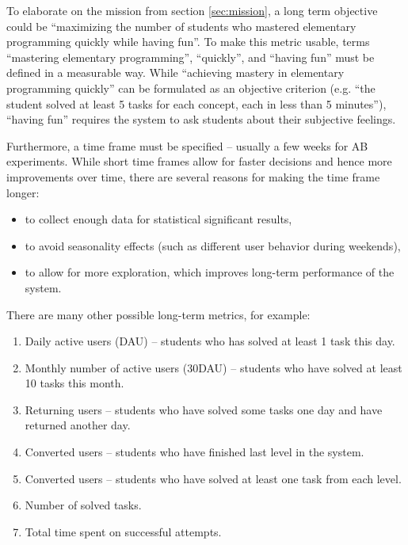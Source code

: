 To elaborate on the mission from section \ref{sec:mission},
  a long term objective could be
  ``maximizing the number of students
  who mastered elementary programming quickly while having fun''.
To make this metric usable,
  terms ``mastering elementary programming'', ``quickly'', and ``having fun''
  must be defined in a measurable way.
While ``achieving mastery in elementary programming quickly'' can be
  formulated as an objective criterion
  (e.g. ``the student solved at least 5 tasks for each concept, each in less than 5 minutes''),
  ``having fun'' requires the system to ask students about their subjective feelings.

Furthermore, a time frame must be specified
  -- usually a few weeks for AB experiments.
While short time frames allow for faster decisions and hence more improvements over time,
there are several reasons for making the time frame longer:
\begin{itemize}
  \item to collect enough data for statistical significant results,
  \item to avoid seasonality effects (such as different user behavior during weekends),
  \item to allow for more exploration, which improves long-term performance of the system.
\end{itemize}

There are many other possible long-term metrics, for example:
\begin{enumerate}
  \item Daily active users (DAU) -- students who has solved at least 1 task this day.
  \item Monthly number of active users (30DAU) -- students who have solved at least 10 tasks this month.
  \item Returning users -- students who have solved some tasks one day and have returned another day.
  \item Converted users -- students who have finished last level in the system.
  \item Converted users -- students who have solved at least one task from each level.
  \item Number of solved tasks.
  \item Total time spent on successful attempts.
\end{enumerate}

